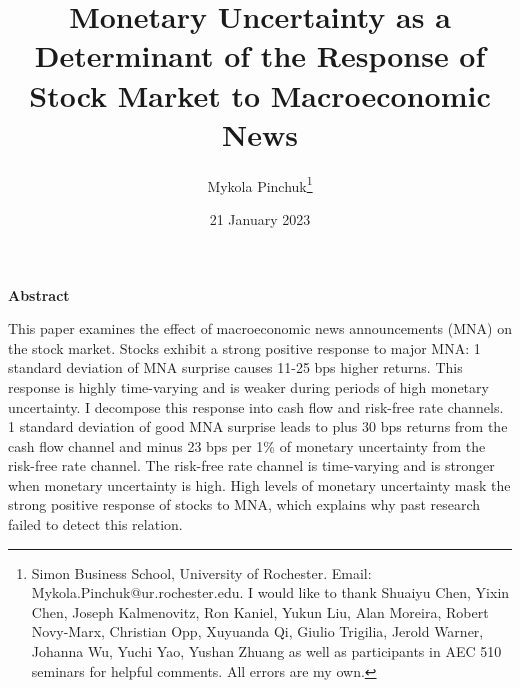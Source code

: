 \documentclass[12pt]{article}
\begin{document}
\onehalfspacing      %
\renewcommand{\footnote}{\endnote}  %

\author{\large{Mykola Pinchuk}\thanks{\rm Simon Business School, University of Rochester. Email: Mykola.Pinchuk@ur.rochester.edu. \newline I would like to thank Shuaiyu Chen, Yixin Chen, Joseph Kalmenovitz, Ron Kaniel, Yukun Liu, Alan Moreira, Robert Novy-Marx, Christian Opp, Xuyuanda Qi, Giulio Trigilia, Jerold Warner, Johanna Wu, Yuchi Yao, Yushan Zhuang as well as participants in AEC 510 seminars for helpful comments. All errors are my own.}}

\title{\bf Monetary Uncertainty as a Determinant of the Response of Stock Market to Macroeconomic News}

\date{21 January 2023}  

\maketitle
\thispagestyle{empty}

\bigskip

\normalsize

\vspace{1cm}

\centerline{\bf Abstract}

\vspace{0.5cm}

\begin{onehalfspace}  %
  \noindent This paper examines the effect of macroeconomic news announcements (MNA) on the stock market. Stocks exhibit a strong positive response to major MNA: 1 standard deviation of MNA surprise causes 11-25 bps higher returns. This response is highly time-varying and is weaker during periods of high monetary uncertainty. I decompose this response into cash flow and risk-free rate channels. 1 standard deviation of good MNA surprise leads to plus 30 bps returns from the cash flow channel and minus 23 bps per 1\% of monetary uncertainty from the risk-free rate channel. The risk-free rate channel is time-varying and is stronger when monetary uncertainty is high. High levels of monetary uncertainty mask the strong positive response of stocks to MNA, which explains why past research failed to detect this relation.  
\end{onehalfspace}
\medskip
\end{document}
